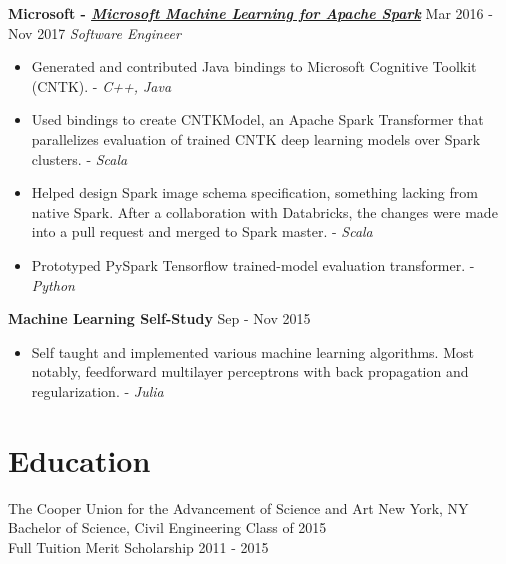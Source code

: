 \documentclass[overlapped]{res}
\begin{document}
\begin{resume}
    {\bf Microsoft - \href{https://www.github.com/Azure/mmlspark}{\underline{\em Microsoft Machine Learning for Apache Spark}}} \hfill Mar 2016 - Nov 2017
    {\em Software Engineer}
    \begin{itemize} \itemsep-2pt
        \item
            Generated and contributed Java bindings to Microsoft Cognitive Toolkit (CNTK). - {\em C++, Java}
        \item
            Used bindings to create CNTKModel, an Apache Spark Transformer that parallelizes evaluation of trained CNTK deep learning models over Spark clusters. - {\em Scala\/}
        \item
            Helped design Spark image schema specification, something lacking from native Spark.
            After a collaboration with Databricks, the changes were made into a pull request and merged to Spark master. - {\em Scala\/}
        \item
            Prototyped PySpark Tensorflow trained-model evaluation transformer. - {\em Python\/}
    \end{itemize}

    {\bf Machine Learning Self-Study} \hfill Sep - Nov 2015
    \begin{itemize} \itemsep-2pt
        \item
            Self taught and implemented various machine learning algorithms.
            Most notably, feedforward multilayer perceptrons with back propagation and regularization. - {\em Julia}
    \end{itemize}


    \section{Education}
    The Cooper Union for the Advancement of Science and Art \hfill New York, NY  \\
    Bachelor of Science, Civil Engineering              \hfill Class of 2015 \\
    Full Tuition Merit Scholarship                          \hfill 2011 - 2015


\end{resume}
\end{document}
